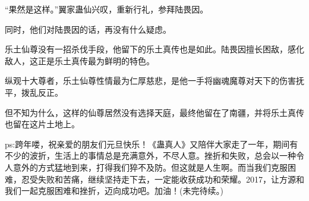 \begin{this_body}
“果然是这样。”翼家蛊仙兴叹，重新行礼，参拜陆畏因。

同时，他们对陆畏因的话，再没有什么疑虑。

乐土仙尊没有一招杀伐手段，他留下的乐土真传也是如此。陆畏因擅长困敌，感化敌人，这正是乐土真传最为鲜明的特色。

纵观十大尊者，乐土仙尊性情最为仁厚慈悲，是他一手将幽魂魔尊对天下的伤害抚平，拨乱反正。

但不知为什么，这样的仙尊居然没有选择天庭，最终他留在了南疆，并将乐土真传也留在这片土地上。

ps:跨年喽，祝亲爱的朋友们元旦快乐！《蛊真人》又陪伴大家走了一年，期间有不少的波折，生活上的事情总是充满意外，不尽人意。挫折和失败，总会以一种令人意外的方式猛地到来，打得我们猝不及防。但这就是人生啊。而当我们克服困难，忍受失败和苦痛，继续坚持走下去，一定能收获成功和荣耀。2017，让方源和我们一起克服困难和挫折，迈向成功吧。加油！(未完待续。)

\end{this_body}

